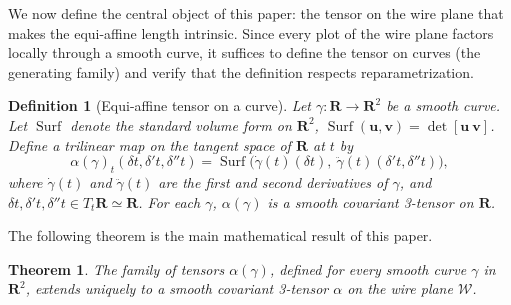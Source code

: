 \documentclass[10pt,letterpaper,reqno]{amsart}
\newcommand{\RR}{\mathbf{R}}
\newcommand{\cW}{\mathcal{W}}
\DeclareMathOperator{\surf}{Surf}
\newtheorem*{theorem}{Theorem} %
\newtheorem*{definition}{Definition}
\begin{document}
  We now define the central object of this paper: the tensor on the wire plane that makes the equi-affine length intrinsic.
  Since every plot of the wire plane factors locally through a smooth curve,
  it suffices to define the tensor on curves (the generating family) and verify that the definition respects reparametrization.
  
  \begin{definition}[Equi-affine tensor on a curve]
    Let $\gamma: \RR \to \RR^2$ be a smooth curve.
    Let $\surf$ denote the standard volume form on $\RR^2$, $\surf(\mathbf{u},\mathbf{v}) = \det[\mathbf{u}\ \mathbf{v}]$.
    Define a trilinear map on the tangent space of $\RR$ at $t$ by
    \[
      \alpha(\gamma)_t(\delta t, \delta' t, \delta'' t) = \surf\!\big(\dot\gamma(t)(\delta t),\ \ddot\gamma(t)(\delta' t, \delta'' t)\big),
      \]
    where $\dot\gamma(t)$ and $\ddot\gamma(t)$ are the first and second derivatives of $\gamma$, and $\delta t, \delta' t, \delta'' t \in T_t\RR \simeq \RR$.
    For each $\gamma$, $\alpha(\gamma)$ is a smooth covariant 3-tensor on $\RR$.
  \end{definition}
  
  The following theorem is the main mathematical result of this paper.
  
  \begin{theorem}
    The family of tensors $\alpha(\gamma)$, defined for every smooth curve $\gamma$ in $\RR^2$, extends uniquely to a smooth covariant 3-tensor $\alpha$ on the wire plane $\cW$.
  \end{theorem}
  
\end{document}
